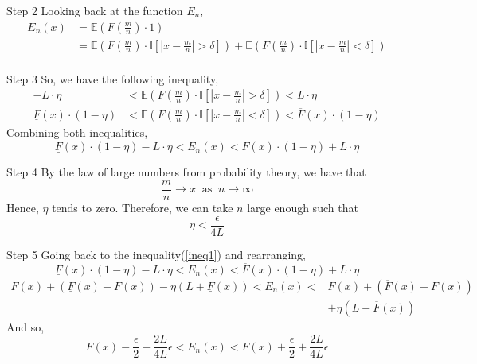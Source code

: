 \documentclass{beamer}
\begin{document}
\begin{frame}{Step 2}
Looking back at the function $E_n$,
\begin{align*}
    E_n(x) &= \mathbb{E}\left(F\left(\frac{m}{n}\right)\cdot1\right) \\
    &= \mathbb{E}\left(F\left(\frac{m}{n}\right)\cdot \mathbb{I}\left[|x-\frac{m}{n}|>\delta\right]\right) + \mathbb{E}\left(F\left(\frac{m}{n}\right)\cdot \mathbb{I}\left[|x-\frac{m}{n}|<\delta\right]\right)\\
\end{align*}
\end{frame}

\begin{frame}{Step 3}
So, we have the following inequality,
\begin{align*}
    -L\cdot\eta&<\mathbb{E}\left(F\left(\frac{m}{n}\right)\cdot \mathbb{I}\left[|x-\frac{m}{n}|>\delta\right]\right)<L\cdot\eta\\
    \underline{F}(x)\cdot(1-\eta)&<\mathbb{E}\left(F\left(\frac{m}{n}\right)\cdot \mathbb{I}\left[|x-\frac{m}{n}|<\delta\right]\right)<\overline{F}(x)\cdot (1-\eta)
\end{align*}
Combining both inequalities, 
\begin{equation}\label{ineq1}
 \underline{F}(x)\cdot(1-\eta)-L\cdot\eta<E_n(x)<\overline{F}(x)\cdot (1-\eta)+L\cdot\eta 
\end{equation}
\end{frame}

\begin{frame}{Step 4}
By the law of large numbers from probability theory, we have that
\begin{equation*}
    \frac{m}{n}\longrightarrow x \;\;\text{as}\;\;n \rightarrow \infty
\end{equation*}
Hence, $\eta$ tends to zero.
\newline
Therefore, we can take $n$ large enough such that 
\begin{equation*}
\eta<\frac{\epsilon}{4L}
\end{equation*}
\end{frame}

\begin{frame}{Step 5}
Going back to the inequality(\ref{ineq1}) and rearranging,
\begin{equation*}
 \underline{F}(x)\cdot(1-\eta)-L\cdot\eta<E_n(x)<\overline{F}(x)\cdot (1-\eta)+L\cdot\eta 
\end{equation*}
\begin{align*}
    F(x)+(\underline{F}(x)-F(x))-\eta(L+\underline{F}(x))<E_n(x)< &F(x)+(\overline{F}(x)-F(x))\\
    &+\eta(L-\overline{F}(x))
\end{align*}
And so,
\begin{equation*}
    F(x)-\frac{\epsilon}{2}-\frac{2L}{4L}\epsilon<E_n(x)<F(x)+\frac{\epsilon}{2}+\frac{2L}{4L}\epsilon
\end{equation*}
\end{frame}
\end{document}
